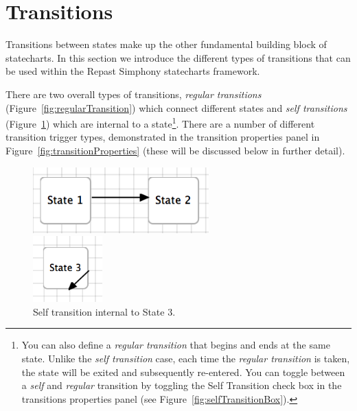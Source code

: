 \documentclass[11pt]{amsart}
\begin{document}
\clearpage

\section{Transitions}
\label{sec:transitions}

Transitions between states make up the other fundamental building block of statecharts. In this section we introduce the different types of transitions that can be used within the Repast Simphony statecharts framework.

There are two overall types of transitions, \emph{regular transitions} (Figure~\ref{fig:regularTransition}) which connect different states and \emph{self transitions} (Figure~\ref{fig:selfTransition}) which are internal to a state\footnote{You can also define a \emph{regular transition} that begins and ends at the same state. Unlike the \emph{self transition} case, each time the \emph{regular transition} is taken, the state will be exited and subsequently re-entered. You can toggle between a \emph{self} and \emph{regular} transition by toggling the Self Transition check box in the transitions properties panel (see Figure~\ref{fig:selfTransitionBox}).}. There are a number of different transition trigger types, demonstrated in the transition properties panel in Figure~\ref{fig:transitionProperties} (these will be discussed below in further detail).

\begin{figure}

\begin{minipage}{.5\textwidth}
\begin{center}
\vspace{.2in}
\centerline {
\includegraphics[height=1in]{StatechartsImages/RegularTransition.png}
}
\caption{Regular transition between states 1 and 2.}
\label{fig:regularTransition}
\end{center}
\end{minipage}%
\begin{minipage}{.5\textwidth}
\begin{center}
\vspace{.2in}
\centerline {
\includegraphics[height=1in]{StatechartsImages/SelfTransition.png}
}
\caption{Self transition internal to State 3.}
\label{fig:selfTransition}
\end{center}
\end{minipage}

\end{figure}
\end{document}
